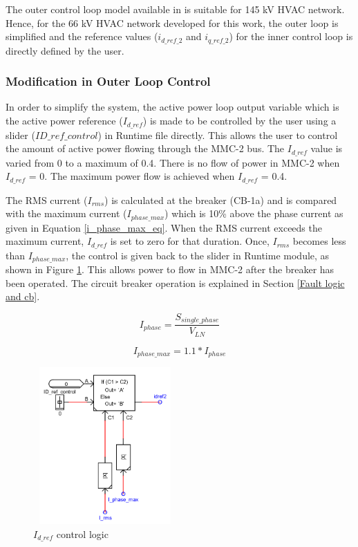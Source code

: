 The outer control loop model available in \cite{vrana2013cigre} is suitable for 145 kV \gls{HVAC} network. Hence, for the 66 kV \gls{HVAC} network developed for this work, the outer loop is simplified and the reference values ($i_{d\_ref\_2}$ and $i_{q\_ref\_2}$) for the inner control loop is directly defined by the user.

\subsubsection{Modification in Outer Loop Control}
In order to simplify the system, the active power loop output variable which is the active power reference ($I_{d\_ref}$) is made to be controlled by the user using a slider ($ID\_ref\_control$) in Runtime file directly. This allows the user to control the amount of active power flowing through the \gls{MMC}-2 bus. The $I_{d\_ref}$ value is varied from 0 to a maximum of 0.4. There is no flow of power in \gls{MMC}-2 when $I_{d\_ref}$ = 0. The maximum power flow is achieved when $I_{d\_ref}$ = 0.4. %

The RMS current ($I_{rms}$) is calculated at the breaker (CB-1a) and is compared with the maximum current ($I_{phase\_max}$) which is 10\% above the phase current as given in Equation \ref{i_phase_max_eq}. When the RMS current exceeds the maximum current, $I_{d\_ref}$ is set to zero for that duration. Once, $I_{rms}$ becomes less than $I_{phase\_max}$, the control is given back to the slider in Runtime module, as shown in Figure \ref{fig:Idref_control}. This allows power to flow in \gls{MMC}-2 after the breaker has been operated. The circuit breaker operation is explained in Section \ref{Fault logic and cb}.

\begin{equation}
    I_{phase} = \frac{S_{single\_phase}}{V_{LN}}
\end{equation}

\begin{equation}\label{i_phase_max_eq}
    I_{phase\_max} = 1.1 * I_{phase}
\end{equation}

\begin{figure}[H]
\centering
    \includegraphics[height = 6cm,width = 5.5cm]{Diagrams/Chapter_4/Idref_control.PNG}
    \caption{$I_{d\_ref}$ control logic}
    \label{fig:Idref_control}
\end{figure}

